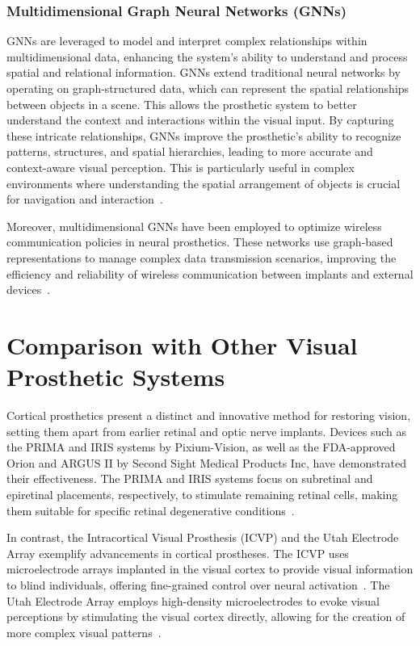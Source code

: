 \documentclass[twocolumn,10pt]{article}
\begin{document}
\subsubsection*{Multidimensional Graph Neural Networks (GNNs)}
GNNs are leveraged to model and interpret complex relationships within
multidimensional data, enhancing the system's ability to understand and process
spatial and relational information. GNNs extend traditional neural networks by
operating on graph-structured data, which can represent the spatial
relationships between objects in a scene. This allows the prosthetic system to
better understand the context and interactions within the visual input. By
capturing these intricate relationships, GNNs improve the prosthetic's ability
to recognize patterns, structures, and spatial hierarchies, leading to more
accurate and context-aware visual perception. This is particularly useful in
complex environments where understanding the spatial arrangement of objects is
crucial for navigation and
interaction~\parencite{subramanianGraphConvolutionalNetworks2020,wuComprehensiveSurveyGraph2021}.

Moreover, multidimensional GNNs have been employed to optimize wireless
communication policies in neural prosthetics. These networks use graph-based
representations to manage complex data transmission scenarios, improving the
efficiency and reliability of wireless communication between implants and
external devices~\parencite{liuMultidimensionalGraphNeural2024}.

\section*{Comparison with Other Visual Prosthetic Systems}\label{sec:comparison}
Cortical prosthetics present a distinct and innovative method for restoring
vision, setting them apart from earlier retinal and optic nerve implants.
Devices such as the PRIMA and IRIS systems by Pixium-Vision, as well as the
FDA-approved Orion and ARGUS II by Second Sight Medical Products Inc, have
demonstrated their effectiveness. The PRIMA and IRIS systems focus on subretinal
and epiretinal placements, respectively, to stimulate remaining retinal cells,
making them suitable for specific retinal degenerative
conditions~\parencites{muqitProstheticVisualAcuity2023,hoLongTermResultsEpiretinal2015}.

In contrast, the Intracortical Visual Prosthesis (ICVP) and the Utah Electrode Array exemplify advancements in cortical prostheses. The ICVP uses microelectrode arrays implanted in the visual cortex to provide visual information to blind individuals, offering fine-grained control over neural activation~\parencite{troykIntracorticalVisualProsthesis2005}. The Utah Electrode Array employs high-density microelectrodes to evoke visual perceptions by stimulating the visual cortex directly, allowing for the creation of more complex visual patterns~\parencite{normannClinicalApplicationsPenetrating2016}.
\end{document}
